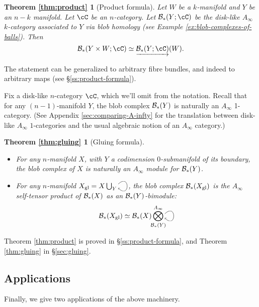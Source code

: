 \newtheorem*{thm:product}{Theorem \ref{thm:product}}

\begin{thm:product}[Product formula]
Let $W$ be a $k$-manifold and $Y$ be an $n-k$ manifold.
Let $\cC$ be an $n$-category.
Let $\bc_*(Y;\cC)$ be the disk-like $A_\infty$ $k$-category associated to $Y$ via blob homology 
(see Example \ref{ex:blob-complexes-of-balls}).
Then
\[
	\bc_*(Y\times W; \cC) \simeq \cl{\bc_*(Y;\cC)}(W).
\]
\end{thm:product}
The statement can be generalized to arbitrary fibre bundles, and indeed to arbitrary maps
(see \S \ref{ss:product-formula}).

Fix a disk-like $n$-category $\cC$, which we'll omit from the notation.
Recall that for any $(n-1)$-manifold $Y$, the blob complex ${\mathcal B}_*(Y)$ is naturally an $A_\infty$ 1-category.
(See Appendix \ref{sec:comparing-A-infty} for the translation between disk-like $A_\infty$ $1$-categories 
and the usual algebraic notion of an $A_\infty$ category.)

\newtheorem*{thm:gluing}{Theorem \ref{thm:gluing}}

\begin{thm:gluing}[Gluing formula]
\mbox{}%
\begin{itemize}
\item For any $n$-manifold $X$, with $Y$ a codimension $0$-submanifold of its boundary, the blob complex of $X$ is naturally an
$A_\infty$ module for ${\mathcal B}_*(Y)$.

\item For any $n$-manifold $X_\text{gl} = X\bigcup_Y \selfarrow$, the blob complex ${\mathcal B}_*(X_\text{gl})$ 
is the $A_\infty$ self-tensor product of
${\mathcal B}_*(X)$ as an ${\mathcal B}_*(Y)$-bimodule:
\begin{equation*}
\bc_*(X_\text{gl}) \simeq \bc_*(X) \Tensor^{A_\infty}_{\mathclap{\bc_*(Y)}} \selfarrow
\end{equation*}
\end{itemize}
\end{thm:gluing}

Theorem \ref{thm:product} is proved in \S \ref{ss:product-formula}, and Theorem \ref{thm:gluing} in \S \ref{sec:gluing}.

\subsection{Applications}
\label{sec:applications}
Finally, we give two applications of the above machinery.

